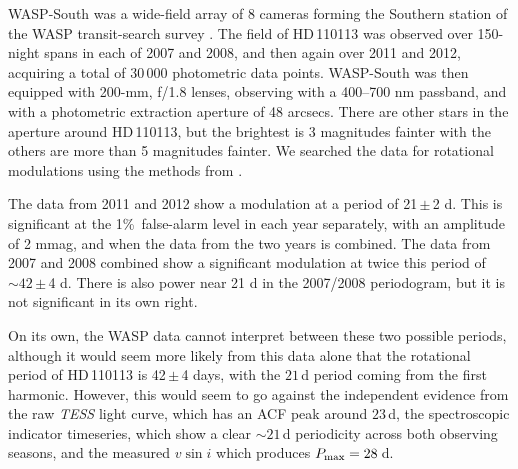 \documentclass[fleqn,usenatbib]{mnras}
\newcommand{\tess}{{\it TESS}}
\newcommand{\vsini}{$v\sin{i}$}
\newcommand{\Tstar}{HD\,110113}
\begin{document}
WASP-South was a wide-field array of 8 cameras forming the Southern station of the WASP transit-search survey \citep{2006PASP..118.1407P}. The field of \Tstar{} was observed over 150-night spans in each of 2007 and 2008, and then again over 2011 and 2012, acquiring a total of 30\,000 photometric data points. 
WASP-South was then equipped with 200-mm, f/1.8 lenses, observing with a 400--700 nm passband, and with a photometric extraction aperture of 48 arcsecs. 
There are other stars in the aperture around \Tstar{}, but the brightest is 3 magnitudes fainter with the others are more than 5 magnitudes fainter. 
We searched the data for rotational modulations using the methods from \citet{2011PASP..123..547M}.  

The data from 2011 and 2012 show a modulation at a period of 21\,$\pm$\,2 d.
This is significant at the 1\%\ false-alarm level in each year separately, with an amplitude of 2 mmag, and when the data from the two years is combined.
The data from 2007 and 2008 combined show a significant modulation at twice this period of $\sim42$\,$\pm$\,4 d.
There is also power near 21 d in the 2007/2008 periodogram, but it is not significant in its own right.

On its own, the WASP data cannot interpret between these two possible periods, although it would seem more likely from this data alone that the rotational period of \Tstar{} is 42\,$\pm$\,4 days, with the $21$\,d period coming from the first harmonic.
However, this would seem to go against the independent evidence from the raw \tess{} light curve, which has an ACF peak around $23$\,d, the spectroscopic indicator timeseries, which show a clear $\sim21$\,d periodicity across both observing seasons, and the measured \vsini{} which produces $P_{\rm max} = 28$\,d.
\end{document}
